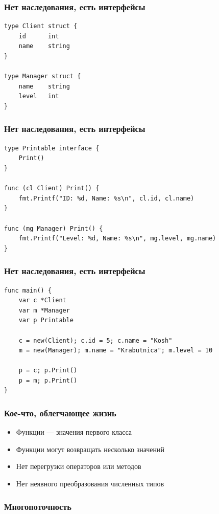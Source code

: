 \documentclass{beamer}
\begin{document}
\begin{frame}[fragile]
  \frametitle{Нет наследования, есть интерфейсы}
\begin{verbatim}
type Client struct {
    id      int
    name    string
}

type Manager struct {
    name    string
    level   int
}
\end{verbatim}
\end{frame}


\begin{frame}[fragile]
  \frametitle{Нет наследования, есть интерфейсы}
\begin{verbatim}
type Printable interface {
    Print()
}

func (cl Client) Print() {
    fmt.Printf("ID: %d, Name: %s\n", cl.id, cl.name)
}

func (mg Manager) Print() {
    fmt.Printf("Level: %d, Name: %s\n", mg.level, mg.name)
}
\end{verbatim}
\end{frame}


\begin{frame}[fragile]
  \frametitle{Нет наследования, есть интерфейсы}
\begin{verbatim}
func main() {
    var c *Client
    var m *Manager
    var p Printable

    c = new(Client); c.id = 5; c.name = "Kosh"
    m = new(Manager); m.name = "Krabutnica"; m.level = 10

    p = c; p.Print()
    p = m; p.Print()
}
\end{verbatim}
\end{frame}


\begin{frame}
  \frametitle{Кое-что, облегчающее жизнь}
  \begin{itemize}
  \item Функции — значения первого класса
    \pause
  \item Функции могут возвращать несколько значений
    \pause
  \item Нет перегрузки операторов или методов
    \pause
  \item Нет неявного преобразования численных типов
  \end{itemize}
\end{frame}



\begin{frame}
  \frametitle{Многопоточность}
  \Large{\textit{\color{ExclamMark}{Не общайтесь с помощью раздельной памяти. Разделяйте память с помощью общения}}}
\end{frame}
\end{document}
